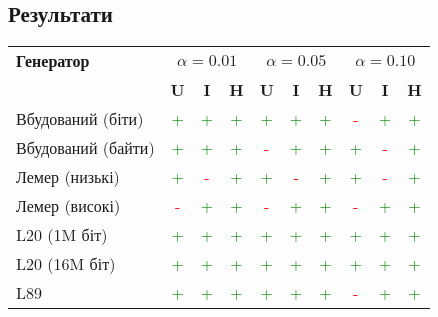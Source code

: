 \documentclass[12pt]{article}
\begin{document}
\subsection{Результати}
\begin{table}[htbp]
\centering
\small
\begin{tabular}{l*{9}{c}}
\toprule
\multirow{}{}{\textbf{Генератор}} & \multicolumn{3}{c}{\textbf{$\alpha = 0.01$}} & \multicolumn{3}{c}{\textbf{$\alpha = 0.05$}} & \multicolumn{3}{c}{\textbf{$\alpha = 0.10$}} \\
\cmidrule(lr){2-4} \cmidrule(lr){5-7} \cmidrule(lr){8-10}
 & \textbf{U} & \textbf{I} & \textbf{H} & \textbf{U} & \textbf{I} & \textbf{H} & \textbf{U} & \textbf{I} & \textbf{H} \\
\midrule
Вбудований (біти)  & \textcolor{green}{+} & \textcolor{green}{+} & \textcolor{green}{+} & \textcolor{green}{+} & \textcolor{green}{+} & \textcolor{green}{+} & \textcolor{red}{-} & \textcolor{green}{+} & \textcolor{green}{+} \\
Вбудований (байти) & \textcolor{green}{+} & \textcolor{green}{+} & \textcolor{green}{+} & \textcolor{red}{-} & \textcolor{green}{+} & \textcolor{green}{+} & \textcolor{green}{+} & \textcolor{red}{-} & \textcolor{green}{+} \\
Лемер (низькі)     & \textcolor{green}{+} & \textcolor{red}{-} & \textcolor{green}{+} & \textcolor{green}{+} & \textcolor{red}{-} & \textcolor{green}{+} & \textcolor{green}{+} & \textcolor{red}{-} & \textcolor{green}{+} \\
Лемер (високі)     & \textcolor{red}{-} & \textcolor{green}{+} & \textcolor{green}{+} & \textcolor{red}{-} & \textcolor{green}{+} & \textcolor{green}{+} & \textcolor{red}{-} & \textcolor{green}{+} & \textcolor{green}{+} \\
L20 (1M біт)       & \textcolor{green}{+} & \textcolor{green}{+} & \textcolor{green}{+} & \textcolor{green}{+} & \textcolor{green}{+} & \textcolor{green}{+} & \textcolor{green}{+} & \textcolor{green}{+} & \textcolor{green}{+} \\
L20 (16M біт)      & \textcolor{green}{+} & \textcolor{green}{+} & \textcolor{green}{+} & \textcolor{green}{+} & \textcolor{green}{+} & \textcolor{green}{+} & \textcolor{green}{+} & \textcolor{green}{+} & \textcolor{green}{+} \\
L89                & \textcolor{green}{+} & \textcolor{green}{+} & \textcolor{green}{+} & \textcolor{green}{+} & \textcolor{green}{+} & \textcolor{green}{+} & \textcolor{red}{-} & \textcolor{green}{+} & \textcolor{green}{+} \\

\end{tabular}
\end{table}
\end{document}
